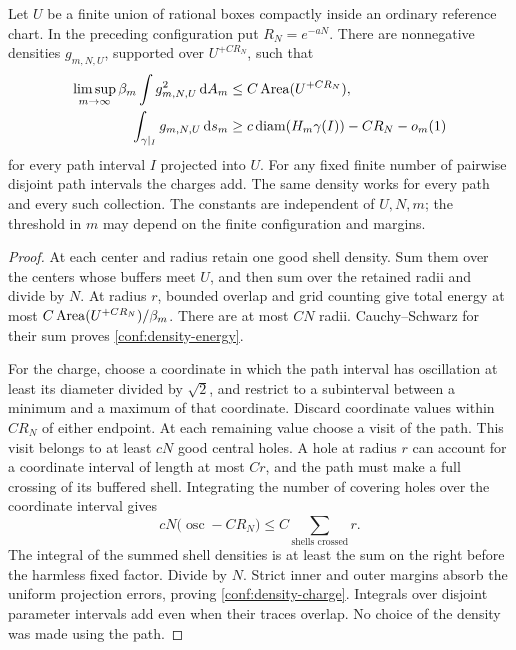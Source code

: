 \begin{lemma}
\label{conf:density-budget}
Let \(U\) be a finite union of rational boxes compactly inside an
ordinary reference chart.  In the preceding configuration put
\(R_N=e^{-aN}\).  There are nonnegative densities \(g_{m,N,U}\),
supported over \(U^{+CR_N}\), such that
\begin{align}
 \limsup_{m\to\infty}\beta_m
       \int g_{m,N,U}^{2}\,\dd A_m
       &\le C\Area(U^{+CR_N}),
       \label{conf:density-energy}\\
 \int_{\gamma|_I}g_{m,N,U}\,\dd s_m
       &\ge c\diam(H_m\gamma(I))-CR_N-o_m(1)
       \label{conf:density-charge}
\end{align}
for every path interval \(I\) projected into \(U\).
For any fixed finite number of pairwise disjoint path intervals the
charges add.  The same density works for every path and every such
collection.  The constants are independent of \(U,N,m\); the
threshold in \(m\) may depend on the finite configuration and margins.
\end{lemma}

\begin{proof}
At each center and radius retain one good shell density.  Sum them over
the centers whose buffers meet \(U\), and then sum over the retained
radii and divide by \(N\).  At radius \(r\), bounded overlap and
grid counting give total energy at most
\(C\operatorname{Area}(U^{+CR_N})/\beta_m\).  There are at most \(CN\) radii.
Cauchy--Schwarz for their sum proves
\eqref{conf:density-energy}.

For the charge, choose a coordinate in which the path interval has
oscillation at least its diameter divided by \(\sqrt2\), and restrict
to a subinterval between a minimum and a maximum of that coordinate.
Discard coordinate values within \(CR_N\) of either endpoint.  At
each remaining value choose a visit of the path.  This visit belongs
to at least \(cN\) good central holes.  A hole at radius \(r\) can
account for a coordinate interval of length at most \(Cr\), and the
path must make a full crossing of its buffered shell.  Integrating the
number of covering holes over the coordinate interval gives
\[
 cN\bigl(\operatorname{osc}-CR_N\bigr)
       \le C\sum_{\text{shells crossed}}r.
\]
The integral of the summed shell densities is at least the sum on the
right before the harmless fixed factor.  Divide by \(N\).  Strict
inner and outer margins absorb the uniform projection errors, proving
\eqref{conf:density-charge}.  Integrals over disjoint parameter
intervals add even when their traces overlap.  No choice of the density
was made using the path.
\end{proof}

